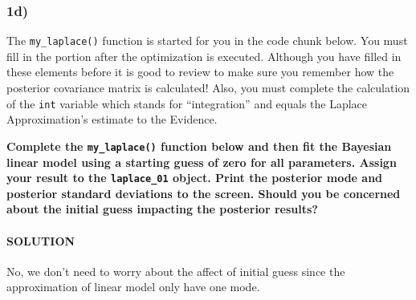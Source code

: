 \documentclass[
]{article}
\begin{document}
\hypertarget{d}{%
\subsubsection{1d)}\label{d}}

The \texttt{my\_laplace()} function is started for you in the code chunk
below. You must fill in the portion after the optimization is executed.
Although you have filled in these elements before it is good to review
to make sure you remember how the posterior covariance matrix is
calculated! Also, you must complete the calculation of the \texttt{int}
variable which stands for ``integration'' and equals the Laplace
Approximation's estimate to the Evidence.

\textbf{Complete the \texttt{my\_laplace()} function below and then fit
the Bayesian linear model using a starting guess of zero for all
parameters. Assign your result to the \texttt{laplace\_01} object. Print
the posterior mode and posterior standard deviations to the screen.
Should you be concerned about the initial guess impacting the posterior
results?}

\hypertarget{solution-3}{%
\paragraph{SOLUTION}\label{solution-3}}

No, we don't need to worry about the affect of initial guess since the
approximation of linear model only have one mode.
\end{document}
